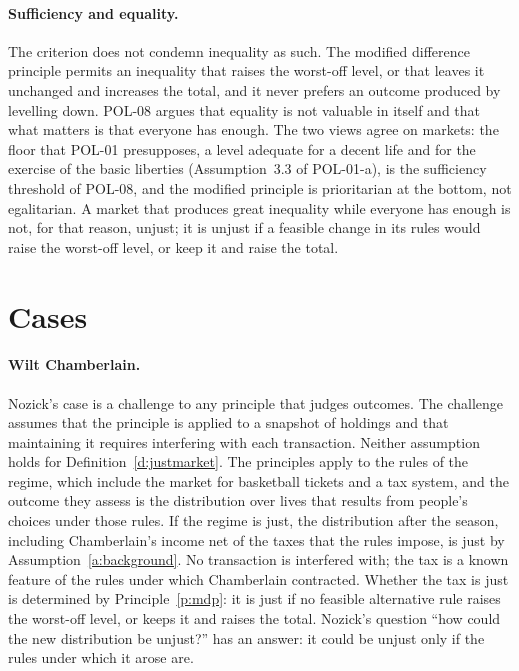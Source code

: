 \documentclass{situationist-preprint}
\begin{document}
\paragraph{Sufficiency and equality.} The criterion does not condemn inequality as such. The modified difference principle permits an inequality that raises the worst-off level, or that leaves it unchanged and increases the total, and it never prefers an outcome produced by levelling down. POL-08 argues that equality is not valuable in itself and that what matters is that everyone has enough. The two views agree on markets: the floor that POL-01 presupposes, a level adequate for a decent life and for the exercise of the basic liberties (Assumption~3.3 of POL-01-a), is the sufficiency threshold of POL-08, and the modified principle is prioritarian at the bottom, not egalitarian. A market that produces great inequality while everyone has enough is not, for that reason, unjust; it is unjust if a feasible change in its rules would raise the worst-off level, or keep it and raise the total.

\section{Cases}

\paragraph{Wilt Chamberlain.} Nozick's case is a challenge to any principle that judges outcomes. The challenge assumes that the principle is applied to a snapshot of holdings and that maintaining it requires interfering with each transaction. Neither assumption holds for Definition~\ref{d:justmarket}. The principles apply to the rules of the regime, which include the market for basketball tickets and a tax system, and the outcome they assess is the distribution over lives that results from people's choices under those rules. If the regime is just, the distribution after the season, including Chamberlain's income net of the taxes that the rules impose, is just by Assumption~\ref{a:background}. No transaction is interfered with; the tax is a known feature of the rules under which Chamberlain contracted. Whether the tax is just is determined by Principle~\ref{p:mdp}: it is just if no feasible alternative rule raises the worst-off level, or keeps it and raises the total. Nozick's question \enquote{how could the new distribution be unjust?} has an answer: it could be unjust only if the rules under which it arose are.
\end{document}
